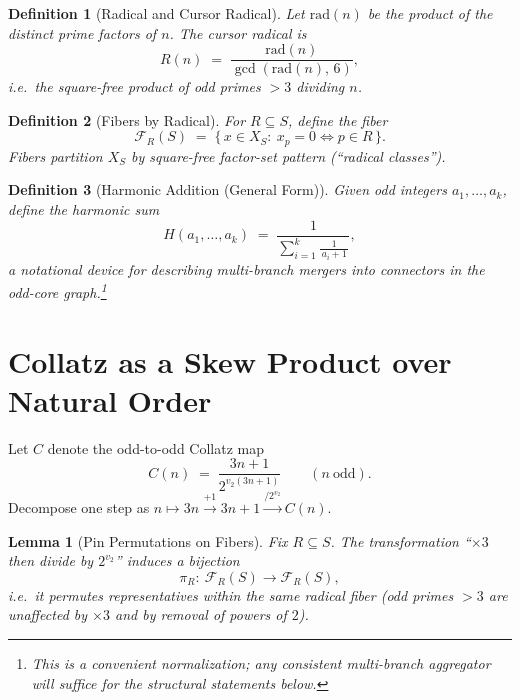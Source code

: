 \documentclass[11pt]{article}
\newtheorem{definition}{Definition}
\newtheorem{lemma}{Lemma}
\begin{document}
\begin{definition}[Radical and Cursor Radical]
Let $\mathrm{rad}(n)$ be the product of the distinct prime factors of $n$. 
The \emph{cursor radical} is
\[
  R(n)\;=\;\frac{\mathrm{rad}(n)}{\gcd(\mathrm{rad}(n),\,6)},
\]
i.e.\ the square-free product of odd primes $>3$ dividing $n$.
\end{definition}

\begin{definition}[Fibers by Radical]
For $R\subseteq S$, define the \emph{fiber}
\[
  \mathcal F_R(S)\;=\;\{\,x\in X_S:\ x_p=0\iff p\in R\,\}.
\]
Fibers partition $X_S$ by square-free factor-set pattern (``radical classes'').
\end{definition}

\begin{definition}[Harmonic Addition (General Form)]
Given odd integers $a_1,\dots,a_k$, define the \emph{harmonic sum}
\[
  H(a_1,\dots,a_k)\;=\;\frac{1}{\sum_{i=1}^k \tfrac{1}{\,a_i+1\,}},
\]
a notational device for describing multi-branch mergers into connectors in the odd-core graph.\footnote{This is a convenient normalization; any consistent multi-branch aggregator will suffice for the structural statements below.}
\end{definition}

\section{Collatz as a Skew Product over Natural Order}

Let $C$ denote the odd-to-odd Collatz map
\[
  C(n)\;=\;\frac{3n+1}{2^{v_2(3n+1)}} \qquad (n\ \text{odd}).
\]
Decompose one step as $n\mapsto 3n \xrightarrow{+1} 3n+1 \xrightarrow{/2^{v_2}} C(n)$.

\begin{lemma}[Pin Permutations on Fibers]
Fix $R\subseteq S$. The transformation ``$\times 3$ then divide by $2^{v_2}$'' induces a bijection
\[
  \pi_R:\ \mathcal F_R(S)\to \mathcal F_R(S),
\]
i.e.\ it permutes representatives \emph{within} the same radical fiber (odd primes $>3$ are unaffected by $\times 3$ and by removal of powers of $2$).\;%
\end{lemma}
\end{document}
